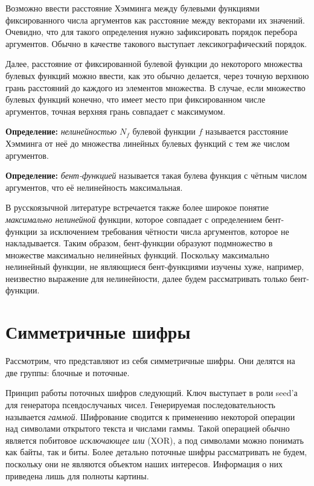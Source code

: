 \documentclass[12pt, a4paper, reqno]{article}
\begin{document}
    Возможно ввести расстояние Хэмминга между булевыми функциями фиксированного числа аргументов как
    расстояние между векторами их значений. Очевидно, что для такого определения нужно зафиксировать
    порядок перебора аргументов. Обычно в качестве такового выступает лексикографический порядок.

    Далее, расстояние от фиксированной булевой функции до некоторого множества булевых функций можно
    ввести, как это обычно делается, через точную верхнюю грань расстояний до каждого из элементов
    множества. В случае, если множество булевых функций конечно, что имеет место при фиксированном
    числе аргументов, точная верхняя грань совпадает с максимумом.

    \textbf{Определение:} \textit{нелинейностью} $N_f$ булевой функции $f$ называется расстояние
    Хэмминга от неё до множества линейных булевых функций с тем же числом аргументов.

    \textbf{Определение:} \textit{бент-функцией} называется такая булева функция с чётным числом
    аргументов, что её нелинейность максимальная.

    В русскоязычной литературе встречается также более широкое понятие \textit{максимально
    нелинейной} функции, которое совпадает с определением бент-функции за исключением требования
    чётности числа аргументов, которое не накладывается. Таким образом, бент-функции образуют
    подмножество в множестве максимально нелинейных функций. Поскольку максимально нелинейный
    функции, не являющиеся бент-функциями изучены хуже, например, неизвестно выражение для
    нелинейности, далее будем рассматривать только бент-функции.

\section{Симметричные шифры}

    Рассмотрим, что представляют из себя симметричные шифры. Они делятся на две группы: блочные и
    поточные.

    Принцип работы поточных шифров следующий. Ключ выступает в роли seed'а для генератора
    псевдослучаных чисел. Генерируемая последовательность называется \textit{гаммой}. Шифрование
    сводится к применению некоторой операции над символами открытого текста и числами гаммы. Такой
    операцией обычно является побитовое \textit{исключающее или} (XOR), а под символами можно
    понимать как байты, так и биты. Более детально поточные шифры рассматривать не будем, поскольку
    они не являются объектом наших интересов. Информация о них приведена лишь для полноты картины.
\end{document}
